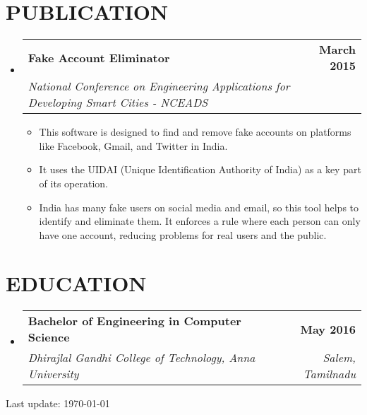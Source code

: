 \documentclass[letterpaper,11pt]{article}
\makeatletter
\newcommand{\resumeItem}[1]{
  \item\small{
    {#1 \vspace{-2pt}}
  }
}
\newcommand{\resumeSubheading}[4]{
  \vspace{-2pt}\item
    \begin{tabular*}{1.0\textwidth}[t]{l@{\extracolsep{\fill}}r}
      \textbf{#1} & \textbf{\small #2} \\
      \textit{\small#3} & \textit{\small #4} \\
    \end{tabular*}\vspace{-7pt}
}
\newcommand{\resumeSubHeadingListStart}{\begin{itemize}[leftmargin=0.0in, label={}]}
\newcommand{\resumeSubHeadingListEnd}{\end{itemize}}
\newcommand{\resumeItemListStart}{\begin{itemize}}
\newcommand{\resumeItemListEnd}{\end{itemize}\vspace{-5pt}}
\makeatother
\begin{document}
\section{PUBLICATION}
    \resumeSubHeadingListStart
        \resumeSubheading{Fake Account Eliminator}{March 2015}{National Conference on Engineering Applications for Developing Smart Cities - NCEADS}{}
            \resumeItemListStart
                \resumeItem{This software is designed to find and remove fake accounts on platforms like Facebook, Gmail, and Twitter in India.}
                \resumeItem{It uses the UIDAI (Unique Identification Authority of India) as a key part of its operation.}
                \resumeItem{India has many fake users on social media and email, so this tool helps to identify and eliminate them. It enforces a rule where each person can only have one account, reducing problems for real users and the public.}
            \resumeItemListEnd
    \resumeSubHeadingListEnd

\section{EDUCATION}
  \resumeSubHeadingListStart
    \resumeSubheading
      {Bachelor of Engineering in Computer Science }{May 2016}
      {Dhirajlal Gandhi College of Technology, Anna University}{Salem, Tamilnadu}
  \resumeSubHeadingListEnd
  
\vspace{200pt} %
\begin{center}
    Last update: \today
\end{center}
     
\end{document}
